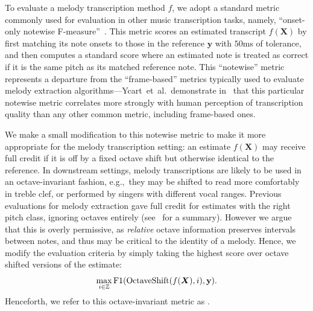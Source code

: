 To evaluate a melody transcription method $f$, 
we adopt a standard metric commonly used for evaluation in other music transcription tasks, namely,  ``onset-only notewise F-measure''~\cite{ycart2020investigating}. 
This metric scores an estimated transcript $f(\bm{X})$ by first matching its note onsets to those in the reference $\bm{y}$ with $50$ms of tolerance, and then computes a standard \fone{} score where an estimated note is treated as correct if it is the same pitch as its matched reference note. 
This ``notewise'' metric represents a departure from the ``frame-based'' metrics typically used to evaluate melody extraction algorithms---Ycart~et~al.\ demonstrate in~\cite{ycart2020investigating} that this particular notewise metric correlates more strongly with human perception of transcription quality than any other common metric, including frame-based ones.

We make a small modification to this notewise metric to make it more appropriate for the melody transcription setting: an estimate $f(\bm{X})$ may receive full credit if it is off by a fixed octave shift but otherwise identical to the reference. 
In downstream settings, melody transcriptions are likely to be used in an octave-invariant fashion, e.g.,~they may be shifted to read more comfortably in treble clef, or performed by singers with different vocal ranges. 
Previous evaluations for melody extraction gave full credit for estimates with the right pitch class, ignoring octaves entirely (see~\cite{poliner2007melody} for a summary). 
However we argue that this is overly permissive, as \emph{relative} octave information preserves intervals between notes, and thus may be critical to the identity of a melody. 
Hence, we modify the evaluation criteria by simply taking the highest score over octave shifted versions of the estimate:
\begin{equation*}
    \max_{i \in \mathbb{Z}} \text{F1}(\text{OctaveShift}(f(\mbox{\boldmath{$X$}}), i), \mathbf{y}).
\end{equation*}
Henceforth, we refer to this octave-invariant metric as \fone. 